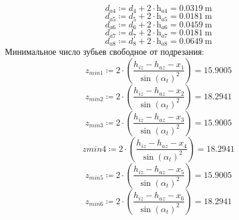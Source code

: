 \documentclass{article}
\newcommand{\defeq}{\coloneq} %
\begin{document}
\begin{equation*}
\textit{d}_{\textit{a4}} \defeq \textit{d}_{\textit{4}}+2 \cdot \textit{h}_{\textit{a4}} = {0.0319 \: \mathrm{m}}
\end{equation*}
\begin{equation*}
\textit{d}_{\textit{a5}} \defeq \textit{d}_{\textit{5}}+2 \cdot \textit{h}_{\textit{a5}} = {0.0181 \: \mathrm{m}}
\end{equation*}
\begin{equation*}
\textit{d}_{\textit{a6}} \defeq \textit{d}_{\textit{6}}+2 \cdot \textit{h}_{\textit{a6}} = {0.0459 \: \mathrm{m}}
\end{equation*}
\begin{equation*}
\textit{d}_{\textit{a7}} \defeq \textit{d}_{\textit{7}}+2 \cdot \textit{h}_{\textit{a7}} = {0.0181 \: \mathrm{m}}
\end{equation*}
\begin{equation*}
\textit{d}_{\textit{a8}} \defeq \textit{d}_{\textit{8}}+2 \cdot \textit{h}_{\textit{a8}} = {0.0649 \: \mathrm{m}}
\end{equation*}
\colorbox[HTML]{000000}{Минимальное число зубьев свободное от подрезания:}\newline
\begin{equation*}
\textit{z}_{\textit{min1}} \defeq 2 \cdot \left( \frac{h_{iz}-h_{az}-\textit{x}_{\textit{1}}}{\sin \left( α_{t} \right)^{2}} \right) = {15.9005}
\end{equation*}
\begin{equation*}
\textit{z}_{\textit{min2}} \defeq 2 \cdot \left( \frac{h_{iz}-h_{az}-\textit{x}_{\textit{2}}}{\sin \left( α_{t} \right)^{2}} \right) = {18.2941}
\end{equation*}
\begin{equation*}
\textit{z}_{\textit{min3}} \defeq 2 \cdot \left( \frac{h_{iz}-h_{az}-\textit{x}_{\textit{3}}}{\sin \left( α_{t} \right)^{2}} \right) = {15.9005}
\end{equation*}
\begin{equation*}
\textit{zmin4} \defeq 2 \cdot \left( \frac{h_{iz}-h_{az}-\textit{x}_{\textit{4}}}{\sin \left( α_{t} \right)^{2}} \right) = {18.2941}
\end{equation*}
\begin{equation*}
\textit{z}_{\textit{min5}} \defeq 2 \cdot \left( \frac{h_{iz}-h_{az}-\textit{x}_{\textit{5}}}{\sin \left( α_{t} \right)^{2}} \right) = {15.9005}
\end{equation*}
\begin{equation*}
\textit{z}_{\textit{min6}} \defeq 2 \cdot \left( \frac{h_{iz}-h_{az}-\textit{x}_{\textit{6}}}{\sin \left( α_{t} \right)^{2}} \right) = {18.2941}
\end{equation*}
\end{document}
